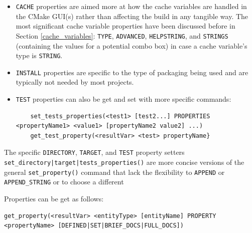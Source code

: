 \documentclass[table, xcdraw]{article}%
\begin{document}
\begin{itemize}
\begin{verbatim}
    propertyName
)
    \end{verbatim}
    The \texttt{DIRECTORY} and \texttt{TARGET_DIRECTORY} keywords are also available in the generic \texttt{set|get_property()} commands with \texttt{SOURCE} as \texttt{entityType}.\\
    Because a source file can be compiled into multiple targets, in each of the directory scopes where the source properties are set, the properties should make sense for all targets using those files.
    \item \texttt{CACHE} properties are aimed more at how the cache variables are handled in the CMake GUI(s) rather than affecting the build in any tangible way. The most significant cache variable properties have been discussed before in Section \ref{cache_variables}: \texttt{TYPE}, \texttt{ADVANCED}, \texttt{HELPSTRING}, and \texttt{STRINGS} (containing the values for a potential combo box) in case a cache variable's type is \texttt{STRING}.
    \item \texttt{INSTALL} properties are specific to the type of packaging being used and are typically not needed by most projects.
    \item \texttt{TEST} properties can also be get and set with more specific commands:
    
    \begin{verbatim}
    set_tests_properties(<test1> [test2...] PROPERTIES <propertyName1> <value1> [propertyName2 value2] ...)
    get_test_property(<resultVar> <test> propertyName}
    \end{verbatim}
\end{itemize}

The specific \texttt{DIRECTORY}, \texttt{TARGET}, and \texttt{TEST} property setters \texttt{set_directory|target|tests_properties()} are more concise versions of the general \texttt{set_property()} command that lack the flexibility to \texttt{APPEND} or \texttt{APPEND_STRING} or to choose a different

Properties can be get as follows:

\begin{verbatim}
get_property(<resultVar> <entityType> [entityName] PROPERTY <propertyName> [DEFINED|SET|BRIEF_DOCS|FULL_DOCS])
\end{verbatim}
\end{document}
